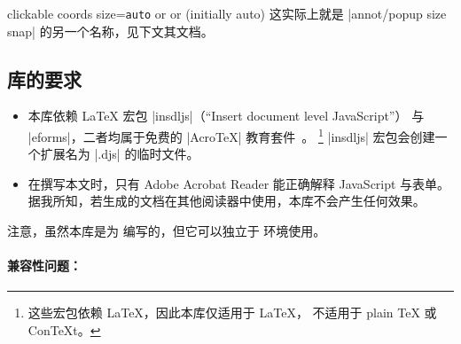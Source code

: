 \begin{pgfplotskey}{%
    clickable coords size=\texttt{auto} or  or
     (initially auto)%
}
    这实际上就是 |annot/popup size snap| 的另一个名称，见下文其文档。
\end{pgfplotskey}


\subsection{库的要求}

\begin{itemize}
    \item 本库依赖 \LaTeX{} 宏包 |insdljs|（“Insert document level JavaScript”）
        与 |eforms|，二者均属于免费的 |AcroTeX| 教育套件~\cite{acrotex}。
        \footnote{这些宏包依赖 \LaTeX{}，因此本库仅适用于 \LaTeX{}，
        不适用于 plain \TeX{} 或 Con\TeX{}t。}
        |insdljs| 宏包会创建一个扩展名为 |.djs| 的临时文件。
    \item 在撰写本文时，只有 Adobe Acrobat Reader 能正确解释 JavaScript 与表单。
        据我所知，若生成的文档在其他阅读器中使用，本库不会产生任何效果。
\end{itemize}
%
注意，虽然本库是为 \PGFPlots{} 编写的，但它可以独立于 \PGFPlots{} 环境使用。


\paragraph{兼容性问题：}

